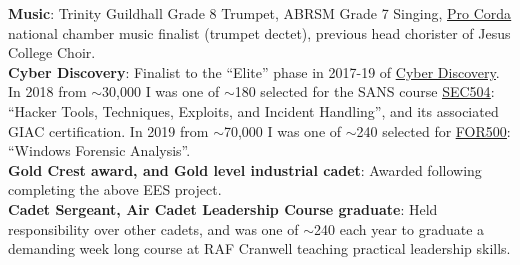 \documentclass[]{resume-openfont}
\begin{document}
 \textbf{Music}{: Trinity Guildhall Grade 8 Trumpet, ABRSM Grade 7 Singing, \href{https://procorda.com/}{\underline{Pro Corda}} national chamber music finalist (trumpet dectet), previous head chorister of Jesus College Choir.} \\
 \textbf{Cyber Discovery}{: Finalist to the ``Elite'' phase in 2017-19 of \href{https://joincyberdiscovery.com/}{\underline{Cyber Discovery}}. In 2018 from $\sim$30,000 I was one of $\sim$180 selected for the SANS course \href{https://www.sans.org/cyber-security-courses/hacker-techniques-incident-handling/}{\underline{SEC504}}: ``Hacker Tools, Techniques, Exploits, and Incident Handling'', and its associated GIAC certification. In 2019 from $\sim$70,000 I was one of $\sim$240 selected for \href{https://www.sans.org/cyber-security-courses/windows-forensic-analysis/}{\underline{FOR500}}: ``Windows Forensic Analysis''.} \\
 \textbf{Gold Crest award, and Gold level industrial cadet}{: Awarded following completing the above EES project.} \\
 \textbf{Cadet Sergeant, Air Cadet Leadership Course graduate}{: Held responsibility over other cadets, and was one of $\sim$240 each year to graduate a demanding week long course at RAF Cranwell teaching practical leadership skills.}
\end{document}
